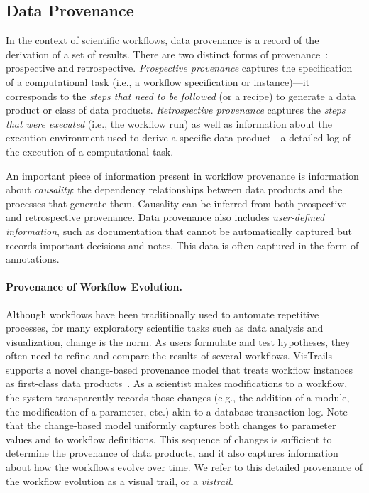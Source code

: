 \documentclass[12pt]{iopart}
\makeatletter
\newcommand{\eg}{e.g.,\xspace}
\newcommand{\ie}{i.e.,\xspace}
\newcommand{\etc}{etc.\@\xspace}
\makeatother
\begin{document}
\subsection{Data Provenance}
In the context of scientific workflows, data provenance is a record of
the derivation of a set of results.  There are two distinct forms of
provenance~\cite{VDL:Challenge06}: prospective and retrospective.
\emph{Prospective provenance} captures the specification of a
computational task (\ie a workflow specification or instance)---it
corresponds to the \emph{steps that need to be followed} (or a recipe)
to generate a data product or class of data products.
\emph{Retrospective provenance} captures the \emph{steps that were
  executed} (\ie the workflow run) as well as information about the
execution environment used to derive a specific data product---a
detailed log of the execution of a computational task.

An important piece of information present in workflow provenance is
information about \emph{causality}: the dependency relationships
between data products and the processes that generate them.  Causality
can be inferred from both prospective and retrospective provenance.
Data provenance also includes \emph{user-defined information}, such as
documentation that cannot be automatically captured but records
important decisions and notes.  This data is often captured in the
form of annotations.

\paragraph{Provenance of Workflow Evolution.}
%
Although workflows have been traditionally used to automate repetitive
processes, for many exploratory scientific tasks such as data analysis
and visualization, change is the norm. As users formulate and test
hypotheses, they often need to refine and compare the results of
several workflows. VisTrails~\cite{vistrails} supports a novel
change-based provenance model that treats workflow instances as
first-class data
products~\cite{Freire:2006:IPAW,callahan@sciflow2006}.  As a scientist
makes modifications to a workflow, the system transparently records
those changes (\eg the addition of a module, the modification of a
parameter, \etc) akin to a database transaction log. Note that the
change-based model uniformly captures both changes to parameter values
and to workflow definitions. This sequence of changes is sufficient to
determine the provenance of data products, and it also captures
information about how the workflows evolve over time.  We refer to
this detailed provenance of the workflow evolution as a visual trail,
or a \emph{vistrail}.
\end{document}
